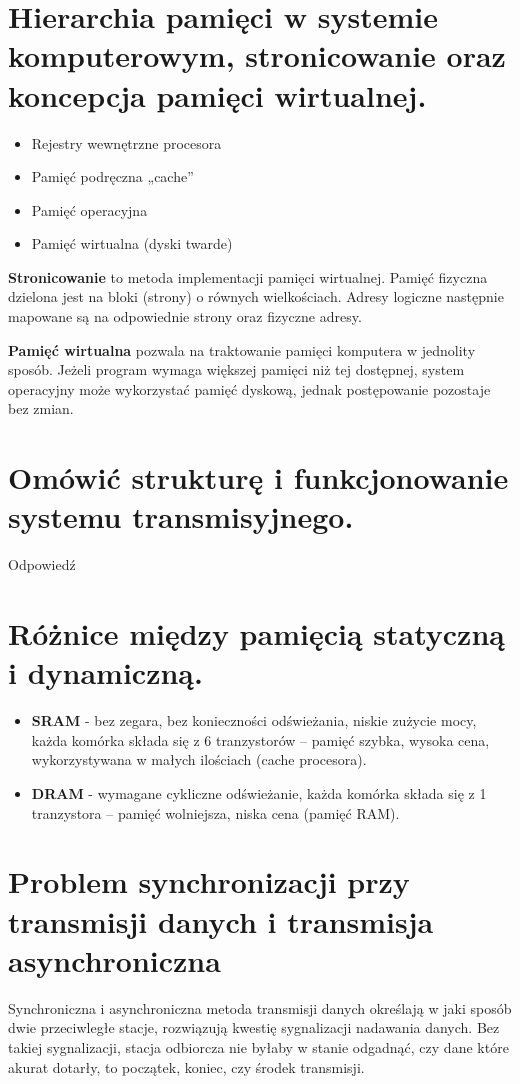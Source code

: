 \documentclass[12pt,a4paper]{article}
\begin{document}
	\section{Hierarchia pamięci w systemie komputerowym, stronicowanie oraz koncepcja pamięci wirtualnej.}
	\begin{itemize}
		\item Rejestry wewnętrzne procesora
		\item Pamięć podręczna „cache”
		\item Pamięć operacyjna
		\item Pamięć wirtualna (dyski twarde)
	\end{itemize}

	\textbf{Stronicowanie} to metoda implementacji pamięci wirtualnej. Pamięć fizyczna dzielona jest na bloki (strony) o równych wielkościach. Adresy logiczne następnie mapowane są na odpowiednie strony oraz fizyczne adresy.
	
	\textbf{Pamięć wirtualna} pozwala na traktowanie pamięci komputera w jednolity sposób. Jeżeli program wymaga większej pamięci niż tej dostępnej, system operacyjny może wykorzystać pamięć dyskową, jednak postępowanie pozostaje bez zmian.

	\section{Omówić strukturę i funkcjonowanie systemu transmisyjnego.}
	Odpowiedź

	\section{Różnice między pamięcią statyczną i dynamiczną.}
	\label{sec:statdyn}
	\begin{itemize}
		\item \textbf{SRAM} - bez zegara, bez konieczności odświeżania, niskie zużycie mocy, każda komórka składa się z 6 tranzystorów -- pamięć szybka, wysoka cena, wykorzystywana w małych ilościach (cache procesora). 
		\item \textbf{DRAM} -  wymagane cykliczne odświeżanie, każda komórka składa się z 1 tranzystora -- pamięć wolniejsza, niska cena (pamięć RAM).
	\end{itemize}

	\section{Problem synchronizacji przy transmisji danych i transmisja asynchroniczna}
	Synchroniczna i asynchroniczna metoda transmisji danych określają w jaki sposób dwie przeciwległe stacje, rozwiązują kwestię sygnalizacji nadawania danych. Bez takiej sygnalizacji, stacja odbiorcza nie byłaby w stanie odgadnąć, czy dane które akurat dotarły, to początek, koniec, czy środek transmisji.
\end{document}
